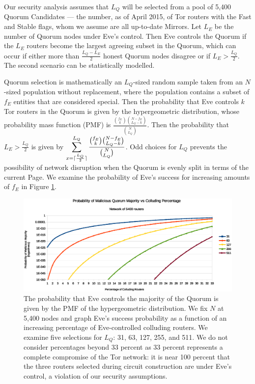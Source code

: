 Our security analysis assumes that $ L_{Q} $ will be selected from a pool of 5,400 Quorum Candidates --- the number, as of April 2015, of Tor routers with the Fast and Stable flags, whom we assume are all up-to-date Mirrors. Let $ L_{E} $ be the number of Quorum nodes under Eve's control. Then Eve controls the Quorum if the $ L_{E} $ routers become the largest agreeing subset in the Quorum, which can occur if either more than $ \frac{L_{Q} - L_{E}}{2} $ honest Quorum nodes disagree or if $ L_{E} > \frac{L_{Q}}{2} $. The second scenario can be statistically modelled.

Quorum selection is mathematically an $ L_{Q} $-sized random sample taken from an $ N $-sized population without replacement, where the population contains a subset of $ f_{E} $ entities that are considered special. Then the probability that Eve controls $ k $ Tor routers in the Quorum is given by the hypergeometric distribution, whose probability mass function (PMF) is $ \frac{\binom{f_{E}}{k}\binom{N - f_{E}}{L_{Q} - k}}{\binom{N}{L_{Q}}} $. Then the probability that $ L_{E} > \frac{L_{Q}}{2} $ is given by $ \displaystyle\sum_{x=\lceil\frac{L_{Q}}{2}\rceil}^{L_{Q}} \frac{\binom{f_{E}}{k}\binom{N - f_{E}}{L_{Q} - k}}{\binom{N}{L_{Q}}} $. Odd choices for $ L_{Q} $ prevents the possibility of network disruption when the Quorum is evenly split in terms of the current Page. We examine the probability of Eve's success for increasing amounts of $ f_{E} $ in Figure \ref{chart:quorumMajority}.

\begin{figure}[htbp]
	\centering
	\includegraphics[width=1\textwidth]{analysis/MaliciousQuorumProbability.eps}
	\caption{The probability that Eve controls the majority of the Quorum is given by the PMF of the hypergeometric distribution. We fix $ N $ at 5,400 nodes and graph Eve's success probability as a function of an increasing percentage of Eve-controlled colluding routers. We examine five selections for $ L_{Q} $: 31, 63, 127, 255, and 511. We do not consider percentages beyond 33 percent as 33 percent represents a complete compromise of the Tor network: it is near 100 percent that the three routers selected during circuit construction are under Eve's control, a violation of our security assumptions.}
	\label{chart:quorumMajority}
\end{figure}

